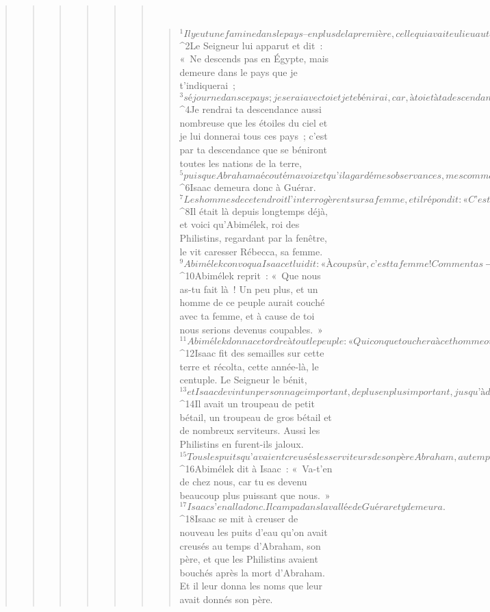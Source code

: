 \begin{verse}
\begin{verse}
\begin{verse}
\begin{verse}
\begin{verse}
\begin{verse}
         
      \bchapter{}
      \begin{verse}
${}^{1}Il y eut une famine dans le pays – en plus de la première, celle qui avait eu lieu au temps d’Abraham – et Isaac partit pour Guérar chez Abimélek, roi des Philistins. 
${}^{2}Le Seigneur lui apparut et dit : « Ne descends pas en Égypte, mais demeure dans le pays que je t’indiquerai ; 
${}^{3}séjourne dans ce pays ; je serai avec toi et je te bénirai, car, à toi et à ta descendance, je donnerai tous ces pays. Je tiendrai le serment que j’ai prêté à Abraham, ton père. 
${}^{4}Je rendrai ta descendance aussi nombreuse que les étoiles du ciel et je lui donnerai tous ces pays ; c’est par ta descendance que se béniront toutes les nations de la terre, 
${}^{5}puisque Abraham a écouté ma voix et qu’il a gardé mes observances, mes commandements, mes décrets et mes lois. »
${}^{6}Isaac demeura donc à Guérar. 
${}^{7}Les hommes de cet endroit l’interrogèrent sur sa femme, et il répondit : « C’est ma sœur », car il avait peur de répondre : « C’est ma femme ». Il se disait : « Les hommes de cet endroit pourraient me tuer à cause de Rébecca, elle est si belle à regarder. » 
${}^{8}Il était là depuis longtemps déjà, et voici qu’Abimélek, roi des Philistins, regardant par la fenêtre, le vit caresser Rébecca, sa femme. 
${}^{9}Abimélek convoqua Isaac et lui dit : « À coup sûr, c’est ta femme ! Comment as-tu pu dire : “C’est ma sœur” ? » Isaac lui répondit : « Je l’ai dit car j’avais peur de mourir à cause d’elle. » 
${}^{10}Abimélek reprit : « Que nous as-tu fait là ! Un peu plus, et un homme de ce peuple aurait couché avec ta femme, et à cause de toi nous serions devenus coupables. » 
${}^{11}Abimélek donna cet ordre à tout le peuple : « Quiconque touchera à cet homme ou à sa femme sera mis à mort. »
${}^{12}Isaac fit des semailles sur cette terre et récolta, cette année-là, le centuple. Le Seigneur le bénit, 
${}^{13}et Isaac devint un personnage important, de plus en plus important, jusqu’à devenir vraiment très important. 
${}^{14}Il avait un troupeau de petit bétail, un troupeau de gros bétail et de nombreux serviteurs. Aussi les Philistins en furent-ils jaloux. 
${}^{15}Tous les puits qu’avaient creusés les serviteurs de son père Abraham, au temps de celui-ci, les Philistins les bouchèrent en les remplissant de terre. 
${}^{16}Abimélek dit à Isaac : « Va-t’en de chez nous, car tu es devenu beaucoup plus puissant que nous. » 
${}^{17}Isaac s’en alla donc. Il campa dans la vallée de Guérar et y demeura. 
${}^{18}Isaac se mit à creuser de nouveau les puits d’eau qu’on avait creusés au temps d’Abraham, son père, et que les Philistins avaient bouchés après la mort d’Abraham. Et il leur donna les noms que leur avait donnés son père.

\end{verse}
\end{verse}
\end{verse}
\end{verse}
\end{verse}
\end{verse}
\end{verse}
